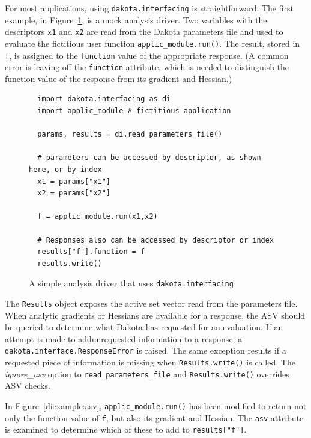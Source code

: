 {For most applications, using {\tt dakota.interfacing} is straightforward. The first example, in Figure~\ref{diexample:simple}, is a mock analysis driver. Two variables with the descriptors {\tt x1} and {\tt x2} are read from the Dakota parameters file and used to evaluate the fictitious user function {\tt applic\_module.run()}. The result, stored in {\tt f}, is assigned to the {\tt function} value of the appropriate response. (A common error is leaving off the {\tt function} attribute, which is needed to distinguish the function value of the response from its gradient and Hessian.)

\begin{figure}
\begin{bigbox}
\begin{small}
\begin{verbatim}
  import dakota.interfacing as di
  import applic_module # fictitious application 

  params, results = di.read_parameters_file()

  # parameters can be accessed by descriptor, as shown here, or by index
  x1 = params["x1"]
  x2 = params["x2"]

  f = applic_module.run(x1,x2)

  # Responses also can be accessed by descriptor or index
  results["f"].function = f
  results.write()
\end{verbatim}
\end{small}
\end{bigbox}
\caption{A simple analysis driver that uses {\tt dakota.interfacing}}
\label{diexample:simple}
\end{figure}

The {\tt Results} object exposes the active set vector read from the parameters file. When analytic gradients or Hessians are available for a response, the ASV should be queried to determine what Dakota has requested for an evaluation. If an attempt is made to addunrequested information to a response, a {\tt dakota.interface.ResponseError} is raised. The same exception results if a requested piece of information is missing when {\tt Results.write()} is called. The \emph{ignore\_asv} option to {\tt read\_parameters\_file} and {\tt Results.write()} overrides ASV checks.

In Figure~\ref{diexample:asv}, {\tt applic\_module.run()} has been modified to return not only the function value of {\tt f}, but also its gradient and Hessian. The {\tt asv} attribute is examined to determine which of these to add to {\tt results["f"]}.

}
